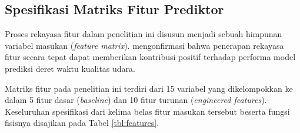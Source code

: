 \subsection{Spesifikasi Matriks Fitur Prediktor}

Proses rekayasa fitur dalam penelitian ini disusun menjadi sebuah himpunan variabel masukan (\textit{feature matrix}). \textcite{naz2024two} mengonfirmasi bahwa penerapan rekayasa fitur secara tepat dapat memberikan kontribusi positif terhadap performa model prediksi deret waktu kualitas udara.

Matriks fitur pada penelitian ini terdiri dari 15 variabel yang dikelompokkan ke dalam 5 fitur dasar (\textit{baseline}) dan 10 fitur turunan (\textit{engineered features}). Keseluruhan spesifikasi dari kelima belas fitur masukan tersebut beserta fungsi fisisnya disajikan pada Tabel \ref{tbl:features}.

